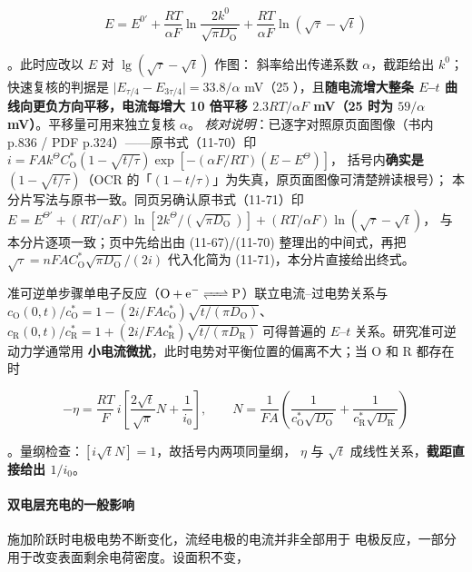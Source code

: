 \begin{equation}
E=E^{0'}+\frac{RT}{\alpha F}\ln\frac{2k^{0}}{\sqrt{\pi D_{\mathrm{O}}}}
+\frac{RT}{\alpha F}\ln\left(\sqrt{\tau}-\sqrt{t}\right)
\label{eq:chrono-irr}
\end{equation}

。此时应改以 $E$ 对 $\lg(\sqrt{\tau}-\sqrt{t})$ 作图：
斜率给出传递系数 $\alpha$，截距给出 $k^{0}$；快速复核的判据是
$\lvert E_{\tau/4}-E_{3\tau/4}\rvert=33.8/\alpha$ mV（25 \degC），且\textbf{随电流增大整条
$E$–$t$ 曲线向更负方向平移，电流每增大 10 倍平移 $2.3RT/\alpha F$ mV（25 \degC 时为
$59/\alpha$ mV）}。平移量可用来独立复核 $\alpha$。
\emph{核对说明}：已逐字对照原页面图像（书内 p.836 / PDF p.324）——原书式（11-70）印
$i=FAk^{\Theta}C_{\mathrm{O}}^{*}\left(1-\sqrt{t/\tau}\right)\exp[-(\alpha F/RT)(E-E^{\Theta})]$，
括号内\textbf{确实是} $(1-\sqrt{t/\tau})$（OCR 的「$(1-t/\tau)$」为失真，原页面图像可清楚辨读根号）；
本分片写法与原书一致。同页另确认原书式（11-71）印
$E=E^{\Theta'}+(RT/\alpha F)\ln[2k^{\Theta}/(\sqrt{\pi D_{\mathrm{O}}})]+(RT/\alpha F)\ln(\sqrt{\tau}-\sqrt{t})$，
与本分片逐项一致；页中先给出由 (11-67)/(11-70) 整理出的中间式，再把
$\sqrt{\tau}=nFAC_{\mathrm{O}}^{*}\sqrt{\pi D_{\mathrm{O}}}/(2i)$ 代入化简为 (11-71)，本分片直接给出终式。

准可逆单步骤单电子反应（$\ce{O + e- <=> P}$）联立电流–过电势关系与
$c_{\mathrm{O}}(0,t)/c_{\mathrm{O}}^{*}=1-(2i/FAc_{\mathrm{O}}^{*})\sqrt{t/(\pi D_{\mathrm{O}})}$、
$c_{\mathrm{R}}(0,t)/c_{\mathrm{R}}^{*}=1+(2i/FAc_{\mathrm{R}}^{*})\sqrt{t/(\pi D_{\mathrm{R}})}$
可得普遍的 $E$–$t$ 关系。研究准可逆动力学通常用
\textbf{小电流微扰}，此时电势对平衡位置的偏离不大；当 $\mathrm{O}$ 和 $\mathrm{R}$ 都存在时

\begin{equation}
-\eta=\frac{RT}{F}\,i\left[\frac{2\sqrt{t}}{\sqrt{\pi}}N+\frac{1}{i_0}\right],
\qquad
N=\frac{1}{FA}\left(\frac{1}{c_{\mathrm{O}}^{*}\sqrt{D_{\mathrm{O}}}}
+\frac{1}{c_{\mathrm{R}}^{*}\sqrt{D_{\mathrm{R}}}}\right)
\label{eq:chrono-eta}
\end{equation}

。量纲检查：$[i\sqrt{t}N]=1$，故括号内两项同量纲，
$\eta$ 与 $\sqrt{t}$ 成线性关系，\textbf{截距直接给出 $1/i_0$}。

\paragraph{双电层充电的一般影响} 施加阶跃时电极电势不断变化，流经电极的电流并非全部用于
电极反应，一部分用于改变表面剩余电荷密度。设面积不变，

